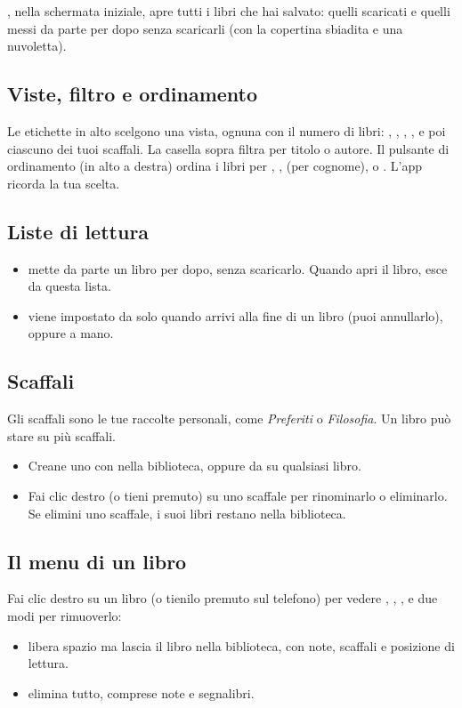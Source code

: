 \documentclass[11pt]{article}
\begin{document}
, nella schermata iniziale, apre tutti i libri che hai salvato: quelli
scaricati e quelli messi da parte per dopo senza scaricarli (con la copertina sbiadita e una
nuvoletta).


\subsection{Viste, filtro e ordinamento}
Le etichette in alto scelgono una vista, ognuna con il numero di libri: ,
, , ,  e poi ciascuno dei tuoi scaffali. La
casella sopra filtra per titolo o autore. Il pulsante di ordinamento (in alto a destra) ordina i
libri per , ,  (per cognome),  o
. L’app ricorda la tua scelta.

\subsection{Liste di lettura}
\begin{itemize}
  \item {} mette da parte un libro per dopo, senza scaricarlo. Quando apri il libro,
        esce da questa lista.
  \item {} viene impostato da solo quando arrivi alla fine di un libro (puoi annullarlo),
        oppure a mano.
\end{itemize}

\subsection{Scaffali}
Gli scaffali sono le tue raccolte personali, come \emph{Preferiti} o \emph{Filosofia}. Un libro
può stare su più scaffali.
\begin{itemize}
  \item Creane uno con  nella biblioteca, oppure da
         su qualsiasi libro.
  \item Fai clic destro (o tieni premuto) su uno scaffale per rinominarlo o eliminarlo. Se elimini
        uno scaffale, i suoi libri restano nella biblioteca.
\end{itemize}

\subsection{Il menu di un libro}
Fai clic destro su un libro (o tienilo premuto sul telefono) per vedere ,
, ,  e due modi per rimuoverlo:
\begin{itemize}
  \item {} libera spazio ma lascia il libro nella biblioteca, con note,
        scaffali e posizione di lettura.
  \item {} elimina tutto, comprese note e segnalibri.
\end{itemize}
\end{document}
